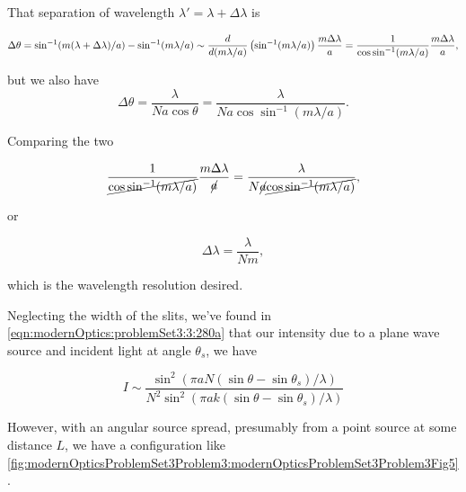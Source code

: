 {

That separation of wavelength $\lambda' = \lambda + \Delta \lambda$ is

\begin{dmath}\label{eqn:modernOptics:problemSet3:3:480}
\Delta \theta
=
\sin^{-1}(m (\lambda + \Delta \lambda)/a)
-
\sin^{-1}(m \lambda/ a)
\sim
\frac{d}{d (m\lambda/a)} \left( \sin^{-1}(m \lambda/ a) \right) \frac{ m \Delta \lambda}{a}
=
\inv{\cos\sin^{-1} (m \lambda/a)}
\frac{ m \Delta \lambda}{a},
\end{dmath}

but we also have
\begin{dmath}\label{eqn:modernOptics:problemSet3:3:500}
\Delta \theta
=
\frac{\lambda}{N a \cos\theta}
=
\frac{\lambda}{N a \cos\sin^{-1}(m \lambda/a)}.
\end{dmath}

Comparing the two

\begin{dmath}\label{eqn:modernOptics:problemSet3:3:520}
\inv{\cancel{\cos\sin^{-1} (m \lambda/a)}}
\frac{ m \Delta \lambda}{\cancel{a}}
=
\frac{\lambda}{N \cancel{a} \cancel{\cos\sin^{-1}(m \lambda/a)}},
\end{dmath}

or

\begin{dmath}\label{eqn:modernOptics:problemSet3:3:540}
\boxed{
\Delta \lambda
=
\frac{\lambda}{N m},
}
\end{dmath}

which is the wavelength resolution desired.


Neglecting the width of the slits, we've found in \ref{eqn:modernOptics:problemSet3:3:280a} that our intensity due to a plane wave source and incident light at angle $\theta_s$, we have

\begin{dmath}\label{eqn:modernOptics:problemSet3:3:560}
I \sim
\frac
{\sin^2( \pi a N (\sin\theta - \sin\theta_s)/\lambda )}
{N^2 \sin^2( \pi a k (\sin\theta - \sin\theta_s)/\lambda )}
\end{dmath}

However, with an angular source spread, presumably from a point source at some distance $L$, we have a configuration like \cref{fig:modernOpticsProblemSet3Problem3:modernOpticsProblemSet3Problem3Fig5}.

}
